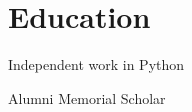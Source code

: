 \documentclass[letterpaper]{deedy-resume} %
\begin{document}
\begin{minipage}[t]{0.32\textwidth}
\section{Education}

Independent work in Python \\

\vspace{0.5\baselineskip}

Alumni Memorial Scholar \\



\end{minipage} %
\hfill
%
%
\end{document}
